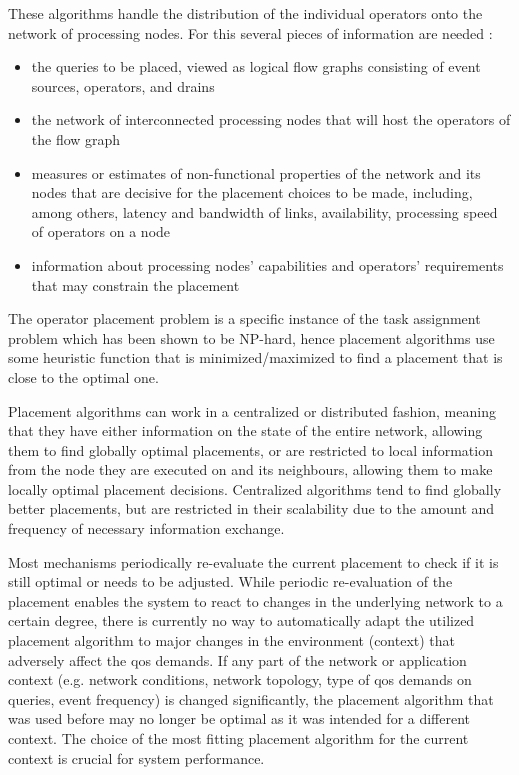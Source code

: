These algorithms handle the distribution of the individual operators onto the network of processing nodes. For this several pieces of information are needed \cite{Lakshmanan2008a}:
\begin{itemize}
\item the queries to be placed, viewed as logical flow graphs consisting of event sources, operators, and drains
\item the network of interconnected processing nodes that will host the operators of the flow graph
\item measures or estimates of non-functional properties of the network and its nodes that are decisive for the placement choices  to be made, including, among others, latency and bandwidth of links, availability, processing speed of operators on a node 
\item information about processing nodes' capabilities and operators' requirements that may constrain the placement
\end{itemize}

The operator placement problem is a specific instance of the task assignment problem which has been shown to be NP-hard, %
hence placement algorithms use some heuristic function that is minimized/maximized to find a placement that is close to the optimal one.

Placement algorithms can work in a centralized or distributed fashion, meaning that they have either information on the state of the entire network, allowing them to find globally optimal placements, or are restricted to local information from the node they are executed on and its neighbours, allowing them to make locally optimal placement decisions. Centralized algorithms tend to find globally better placements, but are restricted in their scalability due to the amount and frequency of necessary information exchange. 

Most mechanisms periodically re-evaluate the current placement to check if it is still optimal or needs to be adjusted. While periodic re-evaluation of the placement enables the system to react to changes in the underlying network to a certain degree, there is currently no way to automatically adapt the utilized placement algorithm to major changes in the environment (context) that adversely affect the \gls{qos} demands.
If any part of the network or application context (e.g. network conditions, network topology, type of \gls{qos} demands on queries, event frequency) is changed significantly, the placement algorithm that was used before may no longer be optimal as it was intended for a different context.
The choice of the most fitting placement algorithm for the current context is crucial for system performance. 


